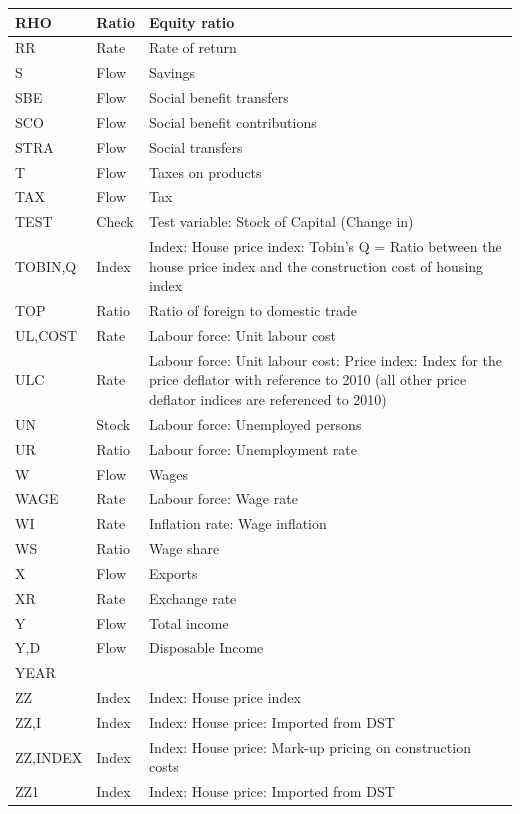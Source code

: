 \documentclass[
]{book}
\begin{document}
\begin{tabular}[t]{l|l|l}
\hline
RHO & Ratio & Equity ratio\\
\hline
RR & Rate & Rate of return\\
\hline
S & Flow & Savings\\
\hline
SBE & Flow & Social benefit transfers\\
\hline
SCO & Flow & Social benefit contributions\\
\hline
STRA & Flow & Social transfers\\
\hline
T & Flow & Taxes on products\\
\hline
TAX & Flow & Tax\\
\hline
TEST & Check & Test variable: Stock of Capital (Change in)\\
\hline
TOBIN,Q & Index & Index: House price index: Tobin's Q = Ratio between the house price index and the construction cost of housing index\\
\hline
TOP & Ratio & Ratio of foreign to domestic trade\\
\hline
UL,COST & Rate & Labour force: Unit labour cost\\
\hline
ULC & Rate & Labour force: Unit labour cost: Price index: Index for the price deflator with reference to 2010 (all other price deflator indices are referenced to 2010)\\
\hline
UN & Stock & Labour force: Unemployed persons\\
\hline
UR & Ratio & Labour force: Unemployment rate\\
\hline
W & Flow & Wages\\
\hline
WAGE & Rate & Labour force: Wage rate\\
\hline
WI & Rate & Inflation rate: Wage inflation\\
\hline
WS & Ratio & Wage share\\
\hline
X & Flow & Exports\\
\hline
XR & Rate & Exchange rate\\
\hline
Y & Flow & Total income\\
\hline
Y,D & Flow & Disposable Income\\
\hline
YEAR &  & \\
\hline
ZZ & Index & Index: House price index\\
\hline
ZZ,I & Index & Index: House price: Imported from DST\\
\hline
ZZ,INDEX & Index & Index: House price: Mark-up pricing on construction costs\\
\hline
ZZ1 & Index & Index: House price: Imported from DST\\
\hline
\end{tabular}
\end{document}
